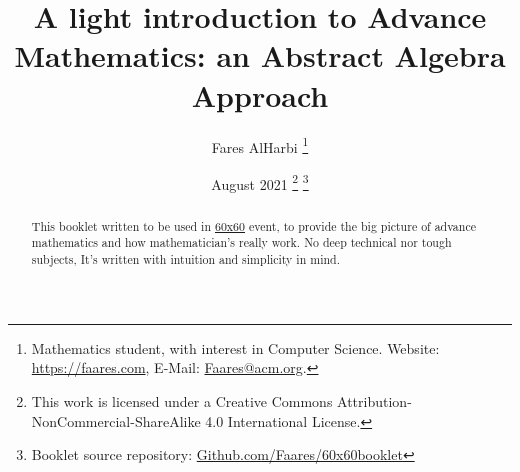 \documentclass{article}
\title{A light introduction to Advance Mathematics: an Abstract Algebra Approach}
\author{Fares AlHarbi \thanks{Mathematics student, with interest in Computer Science. Website: \href{https://Faares.com}{https://faares.com}, E-Mail: \href{mailto:faares@acm.org}{Faares@acm.org}.} }
\date{August 2021 \footnote{This work is licensed under a Creative Commons Attribution-NonCommercial-ShareAlike 4.0 International License.} \footnote{Booklet source repository: \href{https://github.com/Faares/60x60booklet}{Github.com/Faares/60x60booklet}}}
\begin{document}
\maketitle
\begin{abstract}
    This booklet written to be used in \hyperlink{https://salla.sa/durba/RYePmz}{60x60} event,
    to provide the big picture of advance mathematics and how mathematician's really work.
    No deep technical nor tough subjects, It's written with intuition and simplicity in mind. 
\end{abstract}

\clearpage
\tableofcontents 




\clearpage





\clearpage

\clearpage



\clearpage

\clearpage
\printbibliography[heading=bibintoc]
\end{document}
